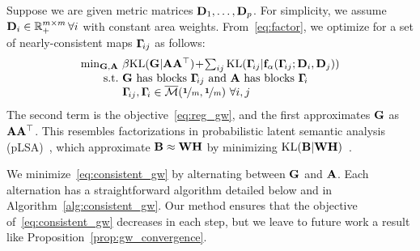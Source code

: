 Suppose we are given metric matrices $\mathbf D_1,\ldots,\mathbf D_p$.  For simplicity, we assume $\mathbf D_i\in\mathbb{R}_+^{m\times m}\,\forall i$ with constant area weights.  From~\eqref{eq:factor}, we optimize for a set of nearly-consistent maps $\mathbf \Gamma\!_{ij}$ as follows:
\begin{equation}\label{eq:consistent_gw}
\begin{array}{r@{\ }l}
\min_{\bG,\bA} & \beta\KL(\bG|\bA\bA^\top)\!+\!\sum_{ij} \KL(\G\!_{ij}|\f_\alpha(\G\!_{ij};\D_i,\D_j))\\
\textrm{s.t.} & \bG\textrm{ has blocks }\G\!_{ij}\textrm{ and }\bA\textrm{ has blocks }\G\!_i\\
& \G\!_{ij},\G\!_i\in\bM(\nicefrac{\1}{m},\nicefrac{\1}{m})\ \forall i,j
\end{array}
\end{equation}
The second term is the \GWa objective~\eqref{eq:reg_gw}, and the first approximates $\mathbf G$ as $\mathbf A\mathbf A^\top$.  This resembles factorizations in probabilistic latent semantic analysis (pLSA)~\cite{hofmann-1999}, which approximate $\mathbf B\approx\mathbf W\mathbf H$ %
by minimizing $\mathrm{KL}(\mathbf B|\mathbf W\mathbf H)$~\cite{gaussier-2005}.   %


We minimize~\eqref{eq:consistent_gw} by alternating between $\mathbf G$ and $\mathbf A$.  Each alternation has a straightforward algorithm detailed below and in Algorithm~\ref{alg:consistent_gw}.  Our method ensures that the objective of~\eqref{eq:consistent_gw} decreases in each step, but we leave to future work a result like Proposition~\ref{prop:gw_convergence}.%



